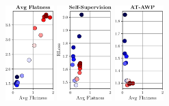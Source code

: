 \begin{figure}[t]
\begin{minipage}[t]{0.12\textwidth}
		\includegraphics[height=3.7cm]{plots_main_flatness_epochs_correlation_seq}
	\end{minipage}
	\begin{minipage}[t]{0.01\textwidth}
		\vspace*{0px}
		
		\hspace*{4px}{\color{black!75}\rule{0.65px}{3.8cm}}
	\end{minipage}
	\begin{minipage}[t]{0.12\textwidth}
		\vspace*{0px}
		
		\includegraphics[height=3.7cm]{plots_main_flatness_epochs_correlation_seq_ssl}
	\end{minipage}
	\begin{minipage}[t]{0.112\textwidth}
		\vspace*{0px}
		
		\includegraphics[height=3.7cm]{plots_main_flatness_epochs_correlation_seq_awp}
	\end{minipage}
	\begin{minipage}[t]{0.17\textwidth}
		\vspace*{-2px}
		

\end{minipage}
\end{figure}
